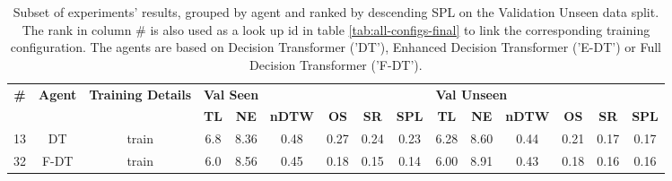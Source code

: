 \begin{table}
\centering
\caption{\label{tab:spatial_features}Subset of experiments' results, grouped by agent and ranked by descending SPL on the Validation Unseen data split. The rank in column \# is also used as a look up id in table \ref{tab:all-configs-final} to link the corresponding training configuration.     \newline The agents are based on Decision Transformer ('DT'), Enhanced Decision Transformer ('E-DT') or Full Decision Transformer ('F-DT').}
\begin{tabular}{@{\hskip3pt}c@{\hskip3pt}c@{\hskip3pt}c@{\hskip3pt}c@{\hskip3pt}c@{\hskip3pt}c@{\hskip3pt}c@{\hskip3pt}c@{\hskip3pt}c@{\hskip3pt}c@{\hskip3pt}c@{\hskip3pt}c@{\hskip3pt}c@{\hskip3pt}c@{\hskip3pt}c}
\toprule
\textbf{\#} & \textbf{Agent} & \textbf{Training Details} & \multicolumn{6}{l}{\textbf{Val Seen}} & \multicolumn{6}{l}{\textbf{Val Unseen}} \\
 \textbf{~} &     \textbf{~} &                \textbf{~} &       \textbf{TL} & \textbf{NE} & \textbf{nDTW} & \textbf{OS} & \textbf{SR} & \textbf{SPL} &         \textbf{TL} & \textbf{NE} & \textbf{nDTW} & \textbf{OS} & \textbf{SR} & \textbf{SPL} \\
\midrule
         13 &             DT &                     train &               6.8 &        8.36 &          0.48 &        0.27 &        0.24 &         0.23 &                6.28 &        8.60 &          0.44 &        0.21 &        0.17 &         0.17 \\
         32 &           F-DT &                     train &               6.0 &        8.56 &          0.45 &        0.18 &        0.15 &         0.14 &                6.00 &        8.91 &          0.43 &        0.18 &        0.16 &         0.16 \\
\bottomrule
\end{tabular}
\end{table}
